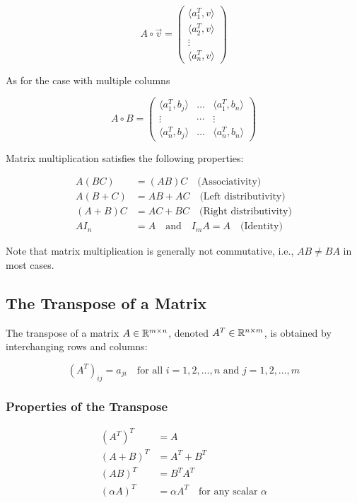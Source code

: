 \[
    A \circ \vec{v} = 
    \begin{pmatrix}
    \langle a_{1}^T, v\rangle \\
    \langle a_{2}^T, v\rangle \\
    \vdots \\
    \langle a_{n}^T, v\rangle 
    \end{pmatrix}
\]

As for the case with multiple columns

\[
    A \circ B = 
    \begin{pmatrix}
    \langle a_{1}^T, b_{j} \rangle & \dots  & \langle a_{1}^T, b_{n} \rangle \\
    \vdots                         & \cdots &              \vdots            \\
    \langle a_{n}^T, b_{j} \rangle & \dots  & \langle a_{n}^T, b_{n} \rangle 
    \end{pmatrix}
\]

Matrix multiplication satisfies the following properties:

\begin{align*}
    A(BC) &= (AB)C \quad \text{(Associativity)} \\
    A(B+C) &= AB + AC \quad \text{(Left distributivity)} \\
    (A+B)C &= AC + BC \quad \text{(Right distributivity)} \\
    AI_n &= A \quad \text{and} \quad I_m A = A \quad \text{(Identity)}
\end{align*}

Note that matrix multiplication is generally not commutative, i.e., \(AB \neq BA\) in most cases.

\subsection{The Transpose of a Matrix}

The transpose of a matrix \(A \in \mathbb{R}^{m \times n}\), denoted \(A^T \in \mathbb{R}^{n \times m}\), is obtained by interchanging rows and columns:

\[
    {(A^T)}_{ij} = a_{ji} \quad \text{for all } i = 1, 2, \ldots, n \text{ and } j = 1, 2, \ldots, m
\]

\subsubsection{Properties of the Transpose}

\begin{align*}
    {(A^T)}^T &= A \\
    {(A + B)}^T &= A^T + B^T \\
    {(AB)}^T &= B^T A^T \\
    {(\alpha A)}^T &= \alpha A^T \quad \text{for any scalar } \alpha
\end{align*}

